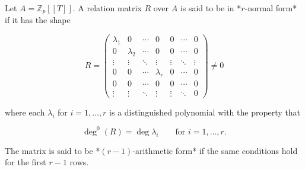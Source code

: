 Let $A = \mathbb{Z}_p[[T]]$. A relation matrix $R$ over $A$ is said to be in *$r$-normal form* if it has the shape

$$
R = \begin{pmatrix}
\lambda_1 & 0 & \cdots & 0 & 0 & \cdots & 0 \\
0 & \lambda_2 & \cdots & 0 & 0 & \cdots & 0 \\
\vdots & \vdots & \ddots & \vdots & \vdots & \ddots & \vdots \\
0 & 0 & \cdots & \lambda_r & 0 & \cdots & 0 \\
0 & 0 & \cdots & 0 & 0 & \cdots & 0 \\
\vdots & \vdots & \ddots & \vdots & \vdots & \ddots & 0
\end{pmatrix} \neq 0
$$

where each $\lambda_i$ for $i = 1, \dots, r$ is a distinguished polynomial with the property that

$$
\deg^0(R) = \deg \lambda_i \qquad \text{for } i = 1, \dots, r.
$$

The matrix is said to be *$(r-1)$-arithmetic form* if the same conditions hold for the first $r-1$ rows.
